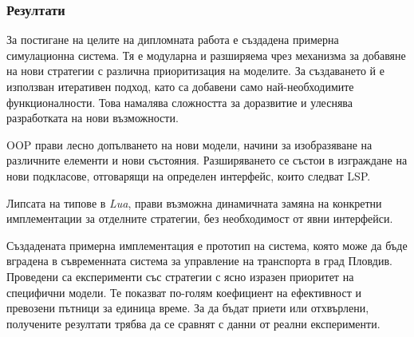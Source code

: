 \subsubsection{Резултати}

		За постигане на целите на дипломната работа е създадена примерна симулационна система. Тя е модуларна и разширяема
		чрез механизма за добавяне на нови стратегии с различна приоритизация на моделите. За създаването й е използван
		итеративен подход, като са добавени само най-необходимите функционалности. Това намалява сложността за доразвитие
		и улеснява разработката на нови възможности. 
		
		\ac{OOP} прави лесно допълването на нови модели, начини за изобразяване на различните елементи и нови състояния.
		Разширяването се състои в изграждане на нови подкласове, отговарящи на определен интерфейс, които следват \ac{LSP}.
		
		Липсата на типове в \emph{Lua}, прави възможна динамичната замяна на конкретни имплементации за отделните стратегии, без
		необходимост от явни интерфейси.
		
		Създадената примерна имплементация е прототип на система, която може да бъде вградена
		в съвременната система за управление на транспорта в град Пловдив. Проведени са експерименти със стратегии 
		с ясно изразен приоритет на специфични модели. Те показват по-голям коефициент на ефективност и превозени пътници за единица време.
		За да бъдат приети или отхвърлени, получените резултати трябва да се сравнят с данни от реални експерименти.